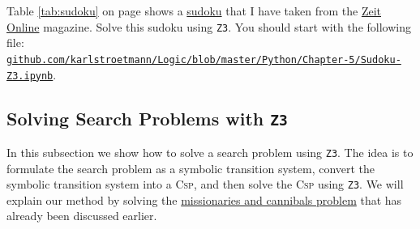\exerciseEng
{}
Table \ref{tab:sudoku} on page \pageref{tab:sudoku} shows a \href{https://en.wikipedia.org/wiki/Sudoku}{sudoku}
that I have taken from the
\href{http://sudoku.zeit.de/cgi-bin/sudoku/sudoku_kd_app_2016.pl?action=level&kd_nr=24091123601092&year=2018&month=03&day=23&level=-c+5}{Zeit Online}
magazine.
Solve this sudoku using \texttt{Z3}.  You should start with the following file:
\\[0.2cm]
\href{https://github.com/karlstroetmann/Logic/blob/master/Python/Chapter-5/Sudoku-Z3.ipynb}{\small\texttt{github.com/karlstroetmann/Logic/blob/master/Python/Chapter-5/Sudoku-Z3.ipynb}}.
    \eox

\subsection{Solving Search Problems with \texttt{Z3}}
In this subsection we show how to solve a search problem using \texttt{Z3}.  The idea is to formulate the
search problem as a symbolic transition system, convert the symbolic transition system into a \textsc{Csp}, and
then solve the \textsc{Csp} using \texttt{Z3}.
We will explain our method by solving the
\href{https://en.wikipedia.org/wiki/Missionaries_and_cannibals_problem}{missionaries and cannibals problem}
that has already been discussed earlier.  

